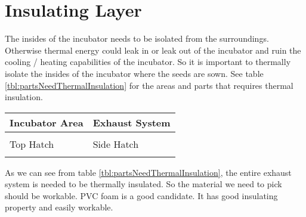 \documentclass[../../main]{subfiles}
\begin{document}
\section{Insulating Layer} \label{sec:}

The insides of the incubator needs to be isolated from the surroundings.
Otherwise thermal energy could leak in or leak out of the incubator and
ruin the cooling / heating capabilities of the incubator. So it is important
to thermally isolate the insides of the incubator where the seeds are sown.
See table \ref{tbl:partsNeedThermalInsulation} for the areas and parts that requires
thermal insulation.

\begin{center}
    \begin{tabularx} {\textwidth} {
            >{\centering \arraybackslash}X
            >{\centering \arraybackslash}X
        }

        \toprule

        Incubator Area & Exhaust System \\ \midrule

        \includegraphics[
            height = 0.2\textheight,
        ] {
            pics/inc_area_right.png
        }

        &

        \includegraphics[
            height = 0.2\textheight,
        ] {
            pics/ext_right.png
        }

        \\ \midrule

        Top Hatch & Side Hatch \\ \midrule

        \includegraphics[
            height = 0.2\textheight,
        ] {
            pics/top_hatch_right.png
        }

        &

        \includegraphics[
            height = 0.2\textheight,
        ] {
            pics/side_hatch_right.png
        }

        \\

        \bottomrule

    \end{tabularx}

    \label{tbl:partsNeedThermalInsulation}
\end{center}


As we can see from table \ref{tbl:partsNeedThermalInsulation}, the entire exhaust system is
needed to be thermally insulated. So the material we need to pick should be workable. PVC
foam is a good candidate. It has good insulating property and easily workable.
\end{document}
